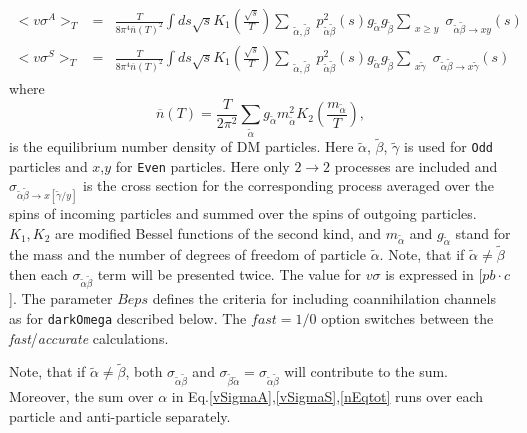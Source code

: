\documentclass[12pt,a4paper]{article}
\begin{document}
\begin{eqnarray}
\label{vSigmaA}
<v\sigma^A>_T &=& \frac{T}{8\pi^4  \overline{n}(T)^2} \int ds\sqrt{s} K_1\left(\frac{\sqrt{s}}{T}\right)   
\sum_{\substack{
\tilde\alpha ,\tilde\beta }}  p_{\tilde\alpha\tilde\beta}^2(s) g_{\tilde\alpha} g_{\tilde\beta} 
\sum_{\substack{ x \ge y }} {\sigma}_{\tilde\alpha\tilde\beta\to x y}(s)\\
\label{vSigmaS}
<v\sigma^S>_T &=& \frac{T}{8\pi^4  \overline{n}(T)^2} \int ds\sqrt{s} K_1\left(\frac{\sqrt{s}}{T}\right)   
\sum_{\substack{
\tilde\alpha ,\tilde\beta }}  p_{\tilde\alpha\tilde\beta}^2(s) g_{\tilde\alpha} g_{\tilde\beta} 
 \sum_{\substack{x  \tilde\gamma }}
 {\sigma}_{\tilde\alpha\tilde\beta\to x\tilde\gamma}(s)
\end{eqnarray}
where 
\begin{equation}
\label{nEqtot}
\overline{n}(T)=\frac{T}{2\pi^2 } \sum_{\tilde\alpha} g_{\tilde\alpha} m^2_{\tilde\alpha} K_2(\frac{m_{\tilde\alpha}}{T}),
\end{equation}
 is the equilibrium number density of DM particles.
Here  $\tilde\alpha$, $\tilde\beta$, $\tilde\gamma$  is used for  {\tt Odd} particles and $x$,$y$
for {\tt Even}  particles.  Here only $2\to 2$ processes are included and   ${\sigma}_{\tilde\alpha\tilde\beta\to x[\tilde\gamma/y]} $ is the cross section for the 
corresponding  process  averaged over the spins of incoming particles and summed
over the spins of outgoing particles.
 $K_1,K_2$ are modified Bessel functions of the second kind, and 
$m_{\tilde\alpha}$ and $g_{\tilde\alpha}$ stand for the  mass and the number of degrees of freedom of particle $\tilde\alpha$.
Note, that if $\tilde\alpha \ne \tilde\beta$ then each
${\sigma}_{\tilde\alpha\tilde\beta}$ term will be presented  twice.
The value for $v\sigma$  is expressed in [$pb\cdot c$].  The parameter $Beps$ defines the criteria for including coannihilation
channels as for {\tt darkOmega} described below.
The $fast=1/0$ option switches between the {\it fast}/{\it accurate} calculations. 

 Note, that if $\tilde\alpha \ne \tilde\beta$, both 
${\sigma}_{\tilde\alpha\tilde\beta}$ and  ${\sigma}_{\tilde\beta\tilde\alpha}={\sigma}_{\tilde\alpha\tilde\beta}$ will contribute to the sum. Moreover, 
 the sum over $\alpha$ in Eq.\ref{vSigmaA},\ref{vSigmaS},\ref{nEqtot} 
 runs over  each  particle and anti-particle separately. 
\end{document}
